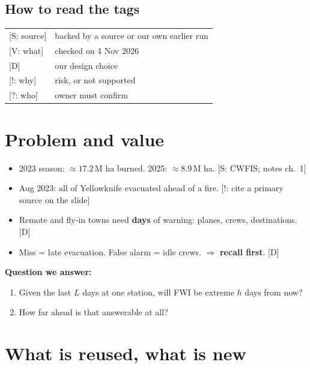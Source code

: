\documentclass[11pt,a4paper]{article}
\newcommand{\tagbox}[2]{{\footnotesize\color{#1}\textsf{[#2]}}}
\newcommand{\supp}[1]{\tagbox{ForestGreen!70!black}{S: #1}}  %
\newcommand{\veri}[1]{\tagbox{ForestGreen!70!black}{V: #1}}  %
\newcommand{\ours}{\tagbox{NavyBlue}{D}}                      %
\newcommand{\caut}[1]{\tagbox{BrickRed}{!: #1}}               %
\newcommand{\todo}[1]{\tagbox{Orange!85!black}{?: #1}}        %
\begin{document}
\subsection*{How to read the tags}
\begin{center}\small
\begin{tabular}{@{}ll@{}}
\supp{source} & backed by a source or our own earlier run\\
\veri{what} & checked on 4 Nov 2026\\
\ours & our design choice\\
\caut{why} & risk, or not supported\\
\todo{who} & owner must confirm\\
\end{tabular}
\end{center}

\newpage
\section{Problem and value}

\begin{itemize}
\item 2023 season: $\approx17.2$\,M ha burned. 2025: $\approx8.9$\,M ha. \supp{CWFIS; notes ch.~1}
\item Aug 2023: all of Yellowknife evacuated ahead of a fire. \caut{cite a primary source on the slide}
\item Remote and fly-in towns need \textbf{days} of warning: planes, crews, destinations. \ours
\item Miss = late evacuation. False alarm = idle crews. $\Rightarrow$ \textbf{recall first}. \ours
\end{itemize}

\textbf{Question we answer:}
\begin{enumerate}
\item Given the last $L$ days at one station, will FWI be extreme $h$ days from now?
\item How far ahead is that answerable at all?
\end{enumerate}

\section{What is reused, what is new}
\end{document}
